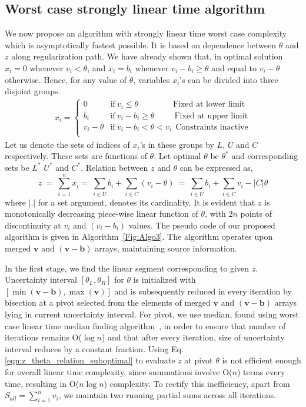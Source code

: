 \documentclass{article}
\begin{document}
\subsection{Worst case strongly linear time algorithm}
We now propose an algorithm with strongly linear time worst case complexity which is asymptotically fastest possible. It is based on dependence between $\theta$ and $z$ along regularization path. We have already shown that, in optimal solution $x_i = 0$ whenever $v_i < \theta$, and $x_i = b_i$ whenever $v_i - b_i \ge \theta$ and equal to $v_i-\theta$ otherwise. Hence, for any value of $\theta$, variables $x_i$'s can be divided into three disjoint groups.
\begin{align}\label{Eqn:theta_to_xa}
 x_i =
  \begin{cases}
   0                 &\text{if}~v_i           \le \theta    ~~~~~~~~~~~~~~~~~~~\text{Fixed at lower limit} \\
   b_i              &\text{if}~v_i - b_i \ge \theta   ~~~~~~~~~~~\text{Fixed at upper limit}\\
   v_i - \theta &\text{if}~v_i - b_i < \theta < v_i  ~~\text{Constraints inactive} \\
  \end{cases}
\end{align}
Let us denote the sets of indices of $x_i$'s in these groups by $L$, $U$ and $C$ respectively. These sets are functions of $\theta$. Let optimal $\theta$ be $\theta^*$ and corresponding sets be $L^*$ $U^*$ and $C^*$. Relation between $z$ and $\theta$ can be expressed as,
\begin{equation}
z ~=~ \sum_{i=1}^n x_i =~ \sum_{i \in U} b_i + \sum_{i \in C}{ (v_i - \theta)} ~=~ \sum_{i \in U} b_i + \sum_{i \in C}{v_i} - | C | \theta \label{eqn:z_theta_relation_suboptimal}
\end{equation}
where $|.|$ for a set argument, denotes its cardinality. It is evident that $z$ is monotonically decreasing piece-wise linear function of $\theta$, with $2n$ points of discontinuity at $v_i$ and $(v_i - b_i)$ values.
The pseudo code of our proposed algorithm is given in Algorithm~\ref{Fig:Algo3}.
The algorithm operates upon merged $\mathbf{v}$ and $\mathbf{(v-b)}$ arrays, maintaining source information.


In the first stage, we find the linear segment corresponding to given $z$. Uncertainty interval $[\theta_L, \theta_R]$ for $\theta$ is initialized with  $[\min(\mathbf{v-b}),\max(\mathbf{v})]$ and is subsequently reduced in every iteration by bisection at a pivot selected from the elements of merged $\mathbf{v}$ and $\mathbf{(v-b)}$ arrays lying in current uncertainty interval.  For pivot, we use median, found using worst case linear time median finding algorithm~\cite{CLR01}, in order to ensure that number of iterations remains O($\log n$) and that after every iteration, size of uncertainty interval reduces by a constant fraction. Using Eq.\eqref{eqn:z_theta_relation_suboptimal} to evaluate $z$ at pivot $\theta$ is not efficient enough for overall linear time complexity, since summations involve O($n$) terms every time, resulting in O($n \log n)$ complexity. To rectify this inefficiency, apart from $S_{all} = \sum_{i=1}^n v_i$, we maintain two running partial sums across all iterations.
\end{document}
